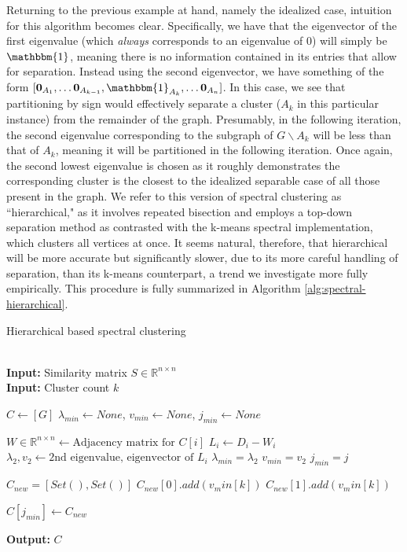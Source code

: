 \documentclass{article}
\begin{document}
Returning to the previous example at hand, namely the idealized case, intuition for this algorithm becomes clear. Specifically, we have that the eigenvector of the first eigenvalue (which \textit{always} corresponds to an eigenvalue of 0) will simply be $\mathbbm{1}$, meaning there is no information contained in its entries that allow for separation. Instead using the second eigenvector, we have something of the form $[\textbf{0}_{A_1},\dots\textbf{0}_{A_{k-1}},\mathbbm{1}_{A_k},\dots\textbf{0}_{A_n}]$. In this case, we see that partitioning by sign would effectively separate a cluster ($A_k$ in this particular instance) from the remainder of the graph. Presumably, in the following iteration, the second eigenvalue corresponding to the subgraph of $G\backslash A_k$ will be less than that of $A_k$, meaning it will be partitioned in the following iteration. Once again, the second lowest eigenvalue is chosen as it roughly demonstrates the corresponding cluster is the closest to the idealized separable case of all those present in the graph. We refer to this version of spectral clustering as ``hierarchical," as it involves repeated bisection and employs a top-down separation method as contrasted with the k-means spectral implementation, which clusters all vertices at once. It seems natural, therefore, that hierarchical will be more accurate but significantly slower, due to its more careful handling of separation, than its k-means counterpart, a trend we investigate more fully empirically. This procedure is fully summarized in Algorithm \ref{alg:spectral-hierarchical}. 

\begin{algorithm}
\caption{Hierarchical based spectral clustering \cite{spectral}}\label{alg:spectral-hierarchical}
\begin{algorithmic}[1]
 \\
\textbf{Input:} Similarity matrix $S\in\mathbb{R}^{n\times n}$ \\
\textbf{Input:} Cluster count $k$

\State $C \gets [G]$
    \State $\lambda_{min} \gets None$, $v_{min} \gets None$, $j_{min} \gets None$
    
        \State $W\in\mathbb{R}^{n\times n} \gets \text{Adjacency matrix for } C[i]$
        \State $L_i \gets D_i - W_i$
        \State $\lambda_2,v_2\gets\text{2nd eigenvalue, eigenvector of } L_i$
            \State $\lambda_{min} = \lambda_2$
            \State $v_{min} = v_2$
            \State $j_{min} = j$
        \EndIf
        
        \State $C_{new} = [Set(),Set()]$
                $C_{new}[0].add(v_min[k])$
            \Else
                $C_{new}[1].add(v_min[k])$
            \EndIf
        \EndFor
        
        \State $C[j_{min}] \gets C_{new}$
    \EndFor
    
\EndFor

\textbf{Output:} $C$
\EndProcedure
\end{algorithmic}
\end{algorithm}
\end{document}
